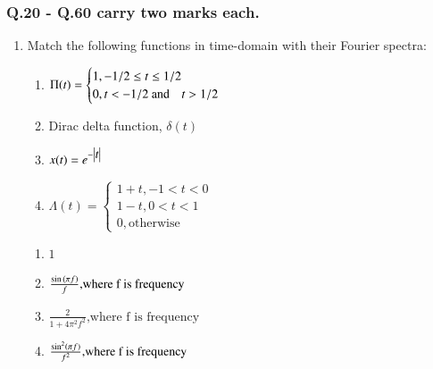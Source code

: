 \documentclass[journal,12pt,onecolumn]{IEEEtran}
\theoremstyle{remark}
\begin{document}
\subsubsection*{Q.20 - Q.60 carry two marks each.}
\begin{enumerate}[start = 21]
    \item Match the following functions in time-domain with their Fourier spectra: \hfill{} 
            \begin{multicols}{2}
                \begin{enumerate}[start=16]
                            \item $\Pi{(t)} =
                                        \begin{cases}
                                        1,-1/2\leq t \leq 1/2\\
                                        0,t<-1/2\text{ and }\hspace{.25cm}t>1/2
                                        \end{cases}  $    
                            \item Dirac delta function, $\delta(t)$
                            \item $x(t) = e^{-\begin{vmatrix}t\end{vmatrix}}$
                            \item $\Lambda{(t)} =
                                    \begin{cases}
                                    1+t,-1<t<0\\
                                    1-t,0<t<1\\
                                    0,\text{otherwise}
                                    \end{cases}  $
                \end{enumerate}
                
    
                \columnbreak
                
                \begin{enumerate}            
                    \item $1$ 
                    \item $ \frac{\sin{\ensuremath{\left(\pi f\right)}}}{f} \text{,where f is frequency }$
                    \item $ \frac{2}{1+4\pi^2f^2}\text{,where f is frequency }$
                    \item $ \frac{\sin^2\left(\pi f\right)}{f^2}\text{,where f is    frequency }$
                \end{enumerate}
               

\end{multicols}
\end{enumerate}
\end{document}
